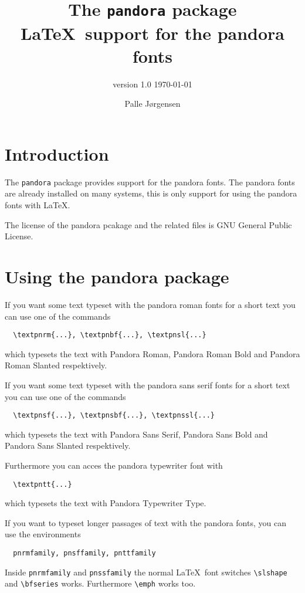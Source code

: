 \documentclass{article}
\title{The \texttt{pandora} package\medskip\\
  \large\LaTeX\ support for the pandora fonts}
\author{version 1.0 \today}
\date{Palle J\o rgensen}
\begin{document}
\maketitle
\section{Introduction}
\label{sec:introduction}
The \texttt{pandora} package provides support for the pandora fonts.
The pandora fonts are already installed on many systems, this is only
support for using the pandora fonts with \LaTeX.

The license of the pandora pcakage and the related files is GNU General
Public License.

\section{Using the pandora package}
\label{sec:using-pandora-fonts}

If you want some text typeset with the pandora roman fonts for a short
text you can use one of the commands

\begin{lstlisting}
  \textpnrm{...}, \textpnbf{...}, \textpnsl{...}
\end{lstlisting}
which typesets the text with Pandora Roman, Pandora Roman Bold and
Pandora Roman Slanted respektively.

If you want some text typeset with the pandora sans serif fonts for a
short text you can use one of the commands

\begin{lstlisting}
  \textpnsf{...}, \textpnsbf{...}, \textpnssl{...}
\end{lstlisting}
which typesets the text with Pandora Sans Serif, Pandora Sans Bold and
Pandora Sans Slanted respektively.

Furthermore you can acces the pandora typewriter font with
\begin{lstlisting}
  \textpntt{...}
\end{lstlisting}
which typesets the text with Pandora Typewriter Type.

If you want to typeset longer passages of text with the pandora fonts,
you can use the environments

\begin{lstlisting}
  pnrmfamily, pnsffamily, pnttfamily
\end{lstlisting}
Inside \texttt{pnrmfamily} and \texttt{pnssfamily} the normal \LaTeX\
font switches \verb+\slshape+ and \verb+\bfseries+ works. Furthermore
\verb+\emph+ works too.
\end{document}
